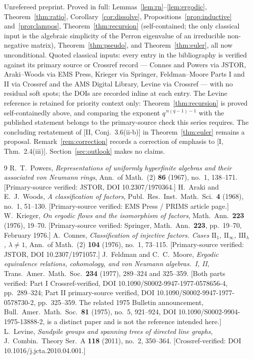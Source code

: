 \documentclass[11pt]{amsart}
\numberwithin{equation}{section}
\theoremstyle{definition}
\theoremstyle{remark}
\begin{document}
Unrefereed preprint. Proved in full: Lemmas~\ref{lem:rn}--\ref{lem:ergodic},
Theorem~\ref{thm:ratio}, Corollary~\ref{cor:dissolve},
Propositions~\ref{prop:inductive} and~\ref{prop:lampos},
Theorem~\ref{thm:recursion} (self-contained; the only classical input is the
algebraic simplicity of the Perron eigenvalue of an irreducible non-negative matrix),
Theorem~\ref{thm:pseudo}, and Theorem~\ref{thm:euler}, all now unconditional.
Quoted classical inputs: every entry in the bibliography is verified against its
primary source or Crossref record --- Connes and Powers via JSTOR, Araki--Woods via
EMS Press, Krieger via Springer, Feldman--Moore Parts I and II via Crossref and the
AMS Digital Library, Levine via Crossref --- with no residual soft spots; the DOIs
are recorded inline at each entry. The Levine reference
\cite{LevineIII} is retained for priority context only: Theorem~\ref{thm:recursion} is
proved self-containedly above, and comparing the exponent $q^{\,n(q-1)-1}$ with the
published statement belongs to the primary-source check this series requires. The concluding restatement of [II, Conj.~3.6(ii-b)] in
Theorem~\ref{thm:euler} remains a proposal.
Remark~\ref{rem:correction} records a correction of emphasis to [I, Thm.~2.4(iii)].
Section~\ref{sec:outlook} makes no claims.

\begingroup\small
\begin{thebibliography}{9}
 R.~T.~Powers, \emph{Representations of uniformly hyperfinite
algebras and their associated von Neumann rings}, Ann.\ of Math.\ (2) \textbf{86}
(1967), no.~1, 138--171. [Primary-source verified: JSTOR, DOI 10.2307/1970364.]
 H.~Araki and E.~J.~Woods, \emph{A classification of factors},
Publ.\ Res.\ Inst.\ Math.\ Sci.\ \textbf{4} (1968), no.~1, 51--130. [Primary-source
verified: EMS Press / PRIMS article page.]
 W.~Krieger, \emph{On ergodic flows and the isomorphism of factors},
Math.\ Ann.\ \textbf{223} (1976), 19--70. [Primary-source verified: Springer,
Math.\ Ann.\ \textbf{223}, pp.~19--70, February 1976.]
 A.~Connes, \emph{Classification of injective factors. Cases
$\mathrm{II}_1$, $\mathrm{II}_\infty$, $\mathrm{III}_\lambda$, $\lambda\neq1$},
Ann.\ of Math.\ (2) \textbf{104} (1976), no.~1, 73--115. [Primary-source
verified: JSTOR, DOI 10.2307/1971057.]
 J.~Feldman and C.~C.~Moore, \emph{Ergodic equivalence
relations, cohomology, and von Neumann algebras.\ I, II}, Trans.\ Amer.\ Math.\ Soc.\
\textbf{234} (1977), 289--324 and 325--359. [Both parts verified: Part I
Crossref-verified, DOI 10.1090/S0002-9947-1977-0578656-4, pp.~289--324; Part II
primary-source verified, DOI 10.1090/S0002-9947-1977-0578730-2, pp.~325--359. The
related 1975 Bulletin announcement, Bull.\ Amer.\ Math.\ Soc.\ \textbf{81} (1975),
no.~5, 921--924, DOI 10.1090/S0002-9904-1975-13888-2, is a distinct paper and is not
the reference intended here.]
 L.~Levine, \emph{Sandpile groups and spanning trees of directed
line graphs}, J.\ Combin.\ Theory Ser.\ A \textbf{118} (2011), no.~2, 350--364.
[Crossref-verified: DOI 10.1016/j.jcta.2010.04.001.]
\end{thebibliography}
\endgroup
\end{document}
